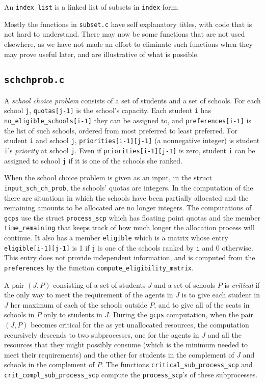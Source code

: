 \documentclass[12pt]{article}
\theoremstyle{definition}
\begin{document}
\begin{appendix}
An \texttt{index\_list} is a linked list of subsets in \texttt{index}
form.  

Mostly the functions in \texttt{subset.c} have self explanatory
titles, with code that is not hard to understand.  There may now be
some functions that are not used elsewhere, as we have not made an
effort to eliminate such functions when they may prove useful later,
and are illustrative of what is possible.

\subsection{\texttt{schchprob.c}}

A \emph{school choice problem} consists of a set of students and a set
of schools.  For each school \texttt{j}, \texttt{quotas[j-1]} is the
school's capacity.  Each student \texttt{i} has
\texttt{no\_eligible\_schools[i-1]} they can be assigned to, and
\texttt{preferences[i-1]} is the list of such schools, ordered from
most preferred to least preferred.  For student \texttt{i} and school
\texttt{j}, \texttt{priorities[i-1][j-1]} (a nonnegative integer) is
student \texttt{i}'s \emph{priority} at school \texttt{j}. Even if
\texttt{priorities[i-1][j-1]} is zero, student \texttt{i} can be
assigned to school \texttt{j} if it is one of the schools she ranked.

When the school choice problem is given as an input, in the struct
\texttt{input\_sch\_ch\_prob}, the schools' quotas are integers.  In
the computation of the  there are situations in which the
schools have been partially allocated and the remaining amounts to be
allocated are no longer integers. The computations of \texttt{gcps}
use the struct \texttt{process\_scp} which has floating point quotas
and the member \texttt{time\_remaining} that keeps track of how much
longer the allocation process will continue.  It also has a member
\texttt{eligible} which is a matrix whose entry
\texttt{eligible[i-1][j-1]} is 1 if \texttt{j} is one of the schools
ranked by \texttt{i} and 0 otherwise.  This entry does not provide
independent information, and is computed from the \texttt{preferences}
by the function \texttt{compute\_eligibility\_matrix}.

A pair $(J,P)$ consisting of a set of students $J$ and a set of
schools $P$ is \emph{critical} if the only way to meet the requirement
of the agents in $J$ is to give each student in $J$ her maximum of
each of the schools outside $P$, and to give all of the seats in
schools in $P$ only to students in $J$.  During the \texttt{gcps}
computation, when the pair $(J,P)$ becomes critical for the as yet
unallocated resources, the computation recursively descends to two
subprocesses, one for the agents in $J$ and all the resources that
they might possibly consume (which is the minimum needed to meet their
requirements) and the other for students in the complement of $J$ and
schools in the complement of $P$.  The functions
\texttt{critical\_sub\_process\_scp} and
\texttt{crit\_compl\_sub\_process\_scp} compute the
\texttt{process\_scp}'s of these subprocesses.


\end{appendix}
\end{document}
